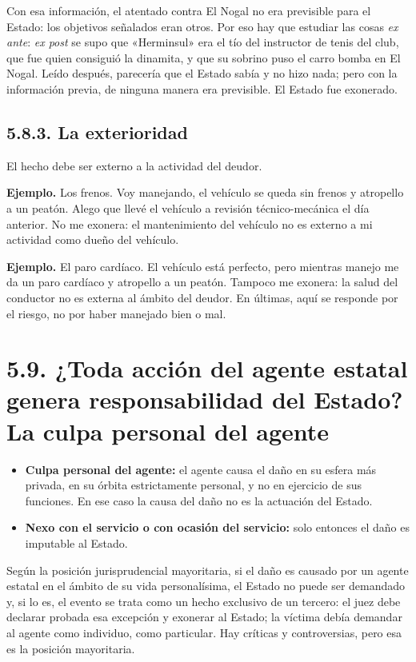 Con esa información, el atentado contra El Nogal no era previsible para el Estado: los objetivos señalados eran otros. Por eso hay que estudiar las cosas \textit{ex ante}: \textit{ex post} se supo que «Herminsul» era el tío del instructor de tenis del club, que fue quien consiguió la dinamita, y que su sobrino puso el carro bomba en El Nogal. Leído después, parecería que el Estado sabía y no hizo nada; pero con la información previa, de ninguna manera era previsible. El Estado fue exonerado.

\subsection{5.8.3. La exterioridad}
El hecho debe ser externo a la actividad del deudor.

\begin{ejemplo}
\textcolor[HTML]{4F6228}{\textbf{Ejemplo. }}Los frenos. Voy manejando, el vehículo se queda sin frenos y atropello a un peatón. Alego que llevé el vehículo a revisión técnico-mecánica el día anterior. No me exonera: el mantenimiento del vehículo no es externo a mi actividad como dueño del vehículo.
\par
\textcolor[HTML]{4F6228}{\textbf{Ejemplo. }}El paro cardíaco. El vehículo está perfecto, pero mientras manejo me da un paro cardíaco y atropello a un peatón. Tampoco me exonera: la salud del conductor no es externa al ámbito del deudor. En últimas, aquí se responde por el riesgo, no por haber manejado bien o mal.
\end{ejemplo}
\section{5.9. ¿Toda acción del agente estatal genera responsabilidad del Estado? La culpa personal del agente}
\begin{itemize}
\item \textbf{Culpa personal del agente:} el agente causa el daño en su esfera más privada, en su órbita estrictamente personal, y no en ejercicio de sus funciones. En ese caso la causa del daño no es la actuación del Estado.
\item \textbf{Nexo con el servicio o con ocasión del servicio:} solo entonces el daño es imputable al Estado.
\end{itemize}
Según la posición jurisprudencial mayoritaria, si el daño es causado por un agente estatal en el ámbito de su vida personalísima, el Estado no puede ser demandado y, si lo es, el evento se trata como un hecho exclusivo de un tercero: el juez debe declarar probada esa excepción y exonerar al Estado; la víctima debía demandar al agente como individuo, como particular. Hay críticas y controversias, pero esa es la posición mayoritaria.

